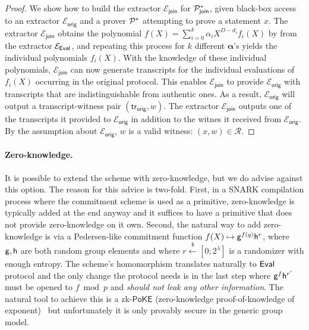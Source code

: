 \documentclass{article}
\theoremstyle{definition}
\begin{document}
\begin{proof}
We show how to build the extractor $\mathcal{E}_\mathsf{join}$ for $\mathcal{P}_\mathsf{join}^*$, given black-box access to an extractor $\mathcal{E}_\mathsf{orig}$ and a prover $\mathcal{P}^*$ attempting to prove a statement $x$. The extractor $\mathcal{E}_\mathsf{join}$ obtains the polynomial $f(X) = \sum_{i=0}^k \alpha_i X^{D-d_i} f_i(X)$ by from the extractor $\mathcal{E}_{\textsf{{Eval}}}$, and repeating this process for $k$ different $\boldsymbol{\alpha}$'s yields the individual polynomials $f_i(X)$. With the knowledge of these individual polynomials, $\mathcal{E}_\mathsf{join}$ can now generate transcripts for the individual evaluations of $f_i(X)$ occurring in the original protocol. This enables $\mathcal{E}_\mathsf{join}$ to provide $\mathcal{E}_\mathsf{orig}$ with transcripts that are indistinguishable from authentic ones. As a result, $\mathcal{E}_\mathsf{orig}$ will output a transcript-witness pair $(\mathsf{tr}_\mathsf{orig}, w)$. The extractor $\mathcal{E}_\mathsf{join}$ outputs one of the transcripts it provided to $\mathcal{E}_\mathsf{orig}$ in addition to the witnes it received from $\mathcal{E}_\mathsf{orig}$. By the assumption about $\mathcal{E}_\mathsf{orig}$, $w$ is a valid witness: $(x,w) \in \mathcal{R}$.
\end{proof}

\paragraph{Zero-knowledge.} It is possible to extend the scheme with zero-knowledge, but we do advise against this option. The reason for this advice is two-fold. First, in a SNARK compilation process where the commitment scheme is used as a primitive, zero-knowledge is typically added at the end anyway and it suffices to have a primitive that does not provide zero-knowledge on it own.
Second, the natural way to add zero-knowledge is via a Pedersen-like commitment function $f(X) \mapsto \mathsf{g}^{f(q)}\mathsf{h}^r$, where $\mathsf{g}, \mathsf{h}$ are both random group elements and where $r \xleftarrow{\$} [0; 2^\lambda]$ is a randomizer with enough entropy.
The scheme's homomorphism translates naturally to $\textsf{{Eval}}$ protocol and the only change the protocol needs is in the last step where $\mathsf{g}^f\mathsf{h}^{r'}$ must be opened to $f \bmod p$ and \emph{should not leak any other information}.
The natural tool to achieve this is a zk-$\mathsf{PoKE}$ (zero-knowledge proof-of-knowledge of exponent)~\cite[\S A.4]{C:BonBunFis19} but unfortunately it is only provably secure in the generic group model.
\end{document}
